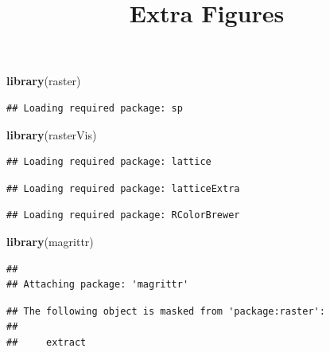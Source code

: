 \documentclass[]{article}
\title{Extra Figures}
\author{}
\date{}
\newenvironment{Shaded}{\begin{snugshade}}{\end{snugshade}}
\newcommand{\KeywordTok}[1]{\textcolor[rgb]{0.13,0.29,0.53}{\textbf{{#1}}}}
\newcommand{\DataTypeTok}[1]{\textcolor[rgb]{0.13,0.29,0.53}{{#1}}}
\newcommand{\DecValTok}[1]{\textcolor[rgb]{0.00,0.00,0.81}{{#1}}}
\newcommand{\FloatTok}[1]{\textcolor[rgb]{0.00,0.00,0.81}{{#1}}}
\newcommand{\StringTok}[1]{\textcolor[rgb]{0.31,0.60,0.02}{{#1}}}
\newcommand{\OtherTok}[1]{\textcolor[rgb]{0.56,0.35,0.01}{{#1}}}
\newcommand{\NormalTok}[1]{{#1}}
\begin{document}
\maketitle

\begin{Shaded}
\begin{Highlighting}[]
\KeywordTok{library}\NormalTok{(raster)}
\end{Highlighting}
\end{Shaded}

\begin{verbatim}
## Loading required package: sp
\end{verbatim}

\begin{Shaded}
\begin{Highlighting}[]
\KeywordTok{library}\NormalTok{(rasterVis)}
\end{Highlighting}
\end{Shaded}

\begin{verbatim}
## Loading required package: lattice
\end{verbatim}

\begin{verbatim}
## Loading required package: latticeExtra
\end{verbatim}

\begin{verbatim}
## Loading required package: RColorBrewer
\end{verbatim}

\begin{Shaded}
\begin{Highlighting}[]
\KeywordTok{library}\NormalTok{(magrittr)}
\end{Highlighting}
\end{Shaded}

\begin{verbatim}
## 
## Attaching package: 'magrittr'
\end{verbatim}

\begin{verbatim}
## The following object is masked from 'package:raster':
## 
##     extract
\end{verbatim}

\begin{Shaded}
\end{Shaded}
\end{document}
